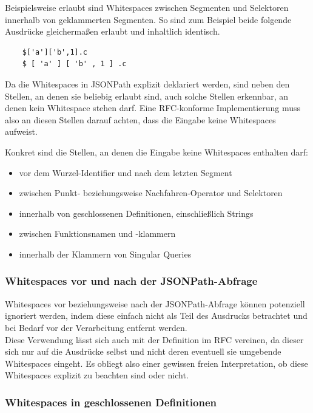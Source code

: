 \documentclass[oneside]{ausarbeitung}
\begin{document}
Beispielsweise erlaubt sind Whitespaces zwischen Segmenten und Selektoren innerhalb von geklammerten Segmenten. So sind zum Beispiel beide folgende Ausdrücke gleichermaßen erlaubt und inhaltlich identisch.
	
\begin{lstlisting}
	$['a']['b',1].c
	$ [ 'a' ] [ 'b' , 1 ] .c
\end{lstlisting}
		
Da die Whitespaces in JSONPath explizit deklariert werden, sind neben den Stellen, an denen sie beliebig erlaubt sind, auch solche Stellen erkennbar, an denen kein Whitespace stehen darf. Eine RFC-konforme Implementierung muss also an diesen Stellen darauf achten, dass die Eingabe keine Whitespaces aufweist. 
	
Konkret sind die Stellen, an denen die Eingabe keine Whitespaces enthalten darf:
	
\begin{itemize}
	\item vor dem Wurzel-Identifier und nach dem letzten Segment
	\item zwischen Punkt- beziehungsweise Nachfahren-Operator und Selektoren
	\item innerhalb von geschlossenen Definitionen, einschließlich Strings
	\item zwischen Funktionsnamen und -klammern
	\item innerhalb der Klammern von Singular Queries
\end{itemize}
	
	
	
\subsubsection{Whitespaces vor und nach der JSONPath-Abfrage}
	
Whitespaces vor beziehungsweise nach der JSONPath-Abfrage können potenziell ignoriert werden, indem diese einfach nicht als Teil des Ausdrucks betrachtet und bei Bedarf vor der Verarbeitung entfernt werden. \\
Diese Verwendung lässt sich auch mit der Definition im RFC vereinen, da dieser sich nur auf die Ausdrücke selbst und nicht deren eventuell sie umgebende Whitespaces eingeht. Es obliegt also einer gewissen freien Interpretation, ob diese Whitespaces explizit zu beachten sind oder nicht. 
	
	
	
\subsubsection{Whitespaces in geschlossenen Definitionen}
	
\end{document}
